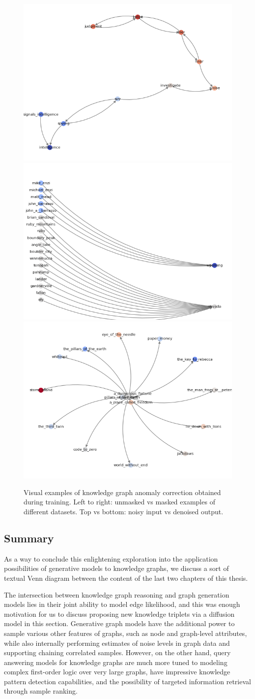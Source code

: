 \begin{figure}[H]
    \hfill
    \includegraphics[width=0.16\linewidth]{figures/kg_generation/wordnet_masked_clean.png}
    \hfill
    \includegraphics[width=0.16\linewidth]{figures/kg_generation/nell_clean.png}
    \hfill
    \includegraphics[width=0.16\linewidth]{figures/kg_generation/nell_masked_clean.png}
    \caption[Visual examples of knowledge graph anomaly correction obtained during training.]{Visual examples of knowledge graph anomaly correction obtained during training. Left to right: unmasked vs masked examples of different datasets. Top vs bottom: noisy input vs denoised output.}
    \label{fig:kg_diffusion_examples}
\end{figure}

\subsection{Summary}
As a way to conclude this enlightening exploration into the application possibilities of generative models to knowledge graphs, we discuss a sort of textual Venn diagram between the content of the last two chapters of this thesis. 

The intersection between knowledge graph reasoning and graph generation models lies in their joint ability to model edge likelihood, and this was enough motivation for us to discuss proposing new knowledge triplets via a diffusion model in this section. Generative graph models have the additional power to sample various other features of graphs, such as node and graph-level attributes, while also internally performing estimates of noise levels in graph data and supporting chaining correlated samples. However, on the other hand, query answering models for knowledge graphs are much more tuned to modeling complex first-order logic over very large graphs, have impressive knowledge pattern detection capabilities, and the possibility of targeted information retrieval through sample ranking.